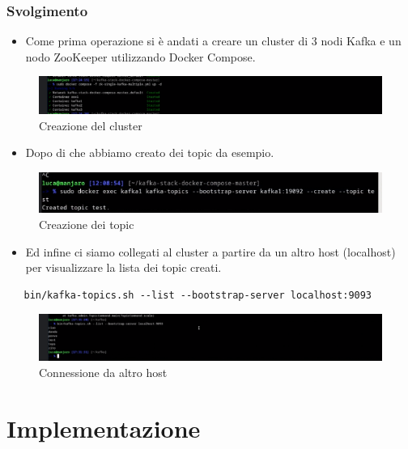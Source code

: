 \documentclass{article}
\begin{document}
\subsubsection{Svolgimento}
\begin{itemize}
    \item Come prima operazione si è andati a creare un cluster di 3 nodi Kafka e un nodo ZooKeeper utilizzando Docker Compose.
\end{itemize}
\begin{figure}[H]
    \centering
    \includegraphics[scale=0.5]{images/cluster.png}
    \caption{Creazione del cluster}
    \label{fig:my_label}
\end{figure}
\begin{itemize}
    \item Dopo di che abbiamo creato dei topic da esempio.
\end{itemize}
\begin{figure}[H]
    \centering
    \includegraphics[scale=0.5]{images/create_topic.png}
    \caption{Creazione dei topic}
    \label{fig:my_label}
\end{figure}
\begin{itemize}
    \item Ed infine ci siamo collegati al cluster a partire da un altro host (localhost) per visualizzare la lista dei topic creati.
\end{itemize}
\begin{lstlisting}
   bin/kafka-topics.sh --list --bootstrap-server localhost:9093
\end{lstlisting}
\begin{figure}[H]
    \centering
    \includegraphics[scale=0.5]{images/test_connect_another_host.png}
    \caption{Connessione da altro host}
    \label{fig:my_label}
\end{figure}
\section{Implementazione}
\end{document}
